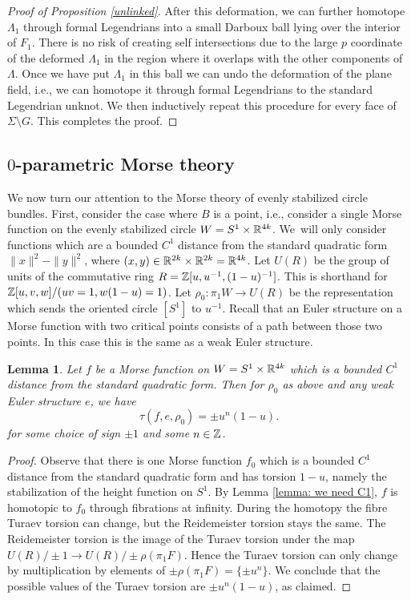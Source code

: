 \documentclass[11pt]{article}
\newcommand{\ie}{i.e.,\xspace}
\numberwithin{equation}{section}\providecommand{\dpl}{\displaystyle}
\theoremstyle{plain}
\newtheorem{lemma}[theorem]{Lemma}
\theoremstyle{definition}
\begin{document}
\begin{proof}[Proof of Proposition \ref{unlinked}]
After this deformation, we can further homotope $\Lambda_1$ through formal Legendrians into a small Darboux ball lying over the interior of $F_1$. There is no risk of creating self intersections due to the large $p$ coordinate of the deformed $\Lambda_1$ in the region where it overlaps with the other components of $\Lambda$. Once we have put $\Lambda_1$ in this ball we can undo the deformation of the plane field, \ie we can homotope it through formal Legendrians to the standard Legendrian unknot. We then inductively repeat this procedure for every face of $\Sigma \setminus G$. This completes the proof. \end{proof}

\subsection{$0$-parametric Morse theory}

We now turn our attention to the Morse theory of evenly stabilized circle bundles. First, consider the case where $B$ is a point, \ie consider a single Morse function on the evenly stabilized circle $W=S^1\times \mathbb{R}^{4k}$. We~will only consider functions which are a bounded $C^1$ distance from the standard quadratic form $\|x\|^2-\|y\|^2$, where $(x,y) \in \mathbb{R}^{2k} \times \mathbb{R}^{2k}=\mathbb{R}^{4k}$. Let $U(R)$ be the group of units of the commutative ring $R=\mathbb{Z}[u,u^{-1},(1-u)^{-1}]$. This is shorthand for \hbox{$\mathbb{Z}[u,v,w]/(uv=1,w(1-u)=1)$}. Let $\rho_0:\pi_1W \to U(R)$ be the representation which sends the oriented circle $[S^1]$ to $u^{-1}$. Recall that an Euler structure on a Morse function with two critical points consists of a path between those two points. In this case this is the same as a weak Euler structure.

\begin{lemma}\label{Lemma 0}
Let $f$ be a Morse function on $W=S^1\times \mathbb{R}^{4k}$ which is a bounded $C^1$ distance from the standard quadratic form. Then for $\rho_0$ as above and any weak Euler structure $e$, we have
\[
\tau(f,e,\rho_0)=\pm u^n(1-u).
\]
for some choice of sign $\pm1$ and some $n \in \mathbb{Z}$.
\end{lemma}

\begin{proof}
Observe that there is one Morse function $f_0$ which is a bounded $C^1$ distance from the standard quadratic form and has torsion $1-u$, namely the stabilization of the height function on $S^1$. By Lemma \ref{lemma: we need C1}, $f$ is homotopic to $f_0$ through fibrations at infinity. During the homotopy the fibre Turaev torsion can change, but the Reidemeister torsion stays the same. The Reidemeister torsion is the image of the Turaev torsion under the map $U(R) / \pm 1 \to U(R)/\pm \rho(\pi_1F)$. Hence the Turaev torsion can only change by multiplication by elements of $\pm \rho(\pi_1F)=\{\pm u^n\}$. We conclude that the possible values of the Turaev torsion are $\pm u^n(1-u)$, as claimed.
\end{proof}
\end{document}
